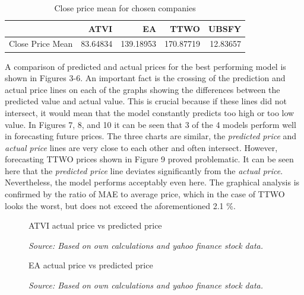 \documentclass[review]{elsarticle} %
\begin{document}
       \begin{table}[H]
       \centering
       \caption{Close price mean for chosen companies}
       \begin{tabular}{lrrrr}
       \toprule
        & ATVI & EA & TTWO & UBSFY \\
       \midrule
       Close Price Mean & 83.64834 & 139.18953 & 170.87719 & 12.83657 \\
       \bottomrule
       \end{tabular}
       \end{table}
       
       
       


A comparison of predicted and actual prices for the best performing model is shown in Figures 3-6. An important fact is the crossing of the prediction and actual price lines on each of the graphs showing the differences between the predicted value and actual value. This is crucial because if these lines did not intersect, it would mean that the model constantly predicts too high or too low value. In Figures 7, 8, and 10 it can be seen that 3 of the 4 models perform well in forecasting future prices. The three charts are similar, the \textit{predicted price} and \textit{actual price} lines are very close to each other and often intersect. However, forecasting TTWO prices shown in Figure 9 proved problematic. It can be seen here that the \textit{predicted price} line deviates significantly from the \textit{actual price}. Nevertheless, the model performs acceptably even here. The graphical analysis is confirmed by the ratio of MAE to average price, which in the case of TTWO looks the worst, but does not exceed the aforementioned 2.1 \%.
\\

\begin{figure}[H]
\caption{ATVI actual price vs predicted price}
\begin{adjustbox}{width=1.3\textwidth,center}

\end{adjustbox}
\caption*{\textit{Source: Based on own calculations and yahoo finance stock data.}}
\end{figure}

\begin{figure}[H]
\caption{EA actual price vs predicted price}
\begin{adjustbox}{width=1.3\textwidth,center}

\end{adjustbox}
\caption*{\textit{Source: Based on own calculations and yahoo finance stock data.}}
\end{figure}
\end{document}
